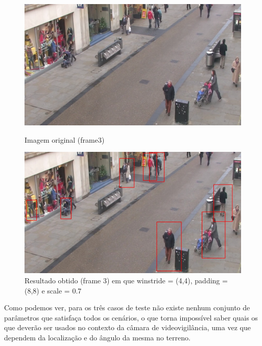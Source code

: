 \begin{figure}[h]
	\centering
	\begin{minipage}[b]{0.49\textwidth}
		\centering
		\includegraphics[width=\textwidth]{img/vision/exemplos/frame3.png}
		\caption[Imagem original (frame3)]{Imagem original (frame3) \newline \newline}
		\label{bluetth05-res}
	\end{minipage}
	\hfill
	\begin{minipage}[b]{0.49\textwidth}
		\centering
		\includegraphics[width=\textwidth]{img/vision/exemplos/result_frame3.jpg}
		\caption[Resultado obtido (frame 3)]{Resultado obtido (frame 3) em que winstride = (4,4), padding = (8,8) e scale = 0.7}
		\label{comimageesqu1ema}
	\end{minipage}
\end{figure}



Como podemos ver, para os três casos de teste não existe nenhum conjunto de parâmetros que satisfaça todos os cenários, o que torna impossível saber quais os que deverão ser usados no contexto da câmara de videovigilância, uma vez que dependem da localização e do ângulo da mesma no terreno. 





